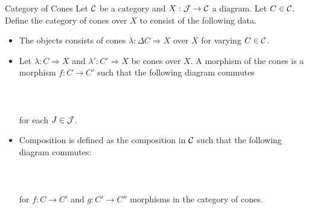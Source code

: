 \documentclass[a4paper]{article}
\begin{document}
\begin{defn}{Category of Cones}{} Let $\mathcal{C}$ be a category and $X:\mathcal{J}\to\mathcal{C}$ a diagram. Let $C\in\mathcal{C}$. Define the category of cones over $X$ to consist of the following data. 
\begin{itemize}
\item The objects consists of cones $\lambda:\Delta C\Rightarrow X$ over $X$ for varying $C\in\mathcal{C}$. 
\item Let $\lambda:C\Rightarrow X$ and $\lambda':C'\Rightarrow X$ be cones over $X$. A morphism of the cones is a morphism $f:C\to C'$ such that the following diagram commutes \\~\\
\\~\\
for each $J\in\mathcal{J}$. 
\item Composition is defined as the composition in $\mathcal{C}$ such that the following diagram commutes: \\~\\
\\~\\
for $f:C\to C'$ and $g:C'\to C''$ morphisms in the category of cones. 
\end{itemize}
\end{defn}
\end{document}
